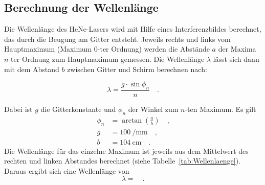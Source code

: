  \subsection{Berechnung der Wellenlänge}
 Die Wellenlänge des HeNe-Lasers wird mit Hilfe eines Interferenzbildes berechnet, das durch die Beugung am Gitter entsteht. Jeweils rechts und links vom Hauptmaximum (Maximum 0-ter Ordnung) werden die Abstände $a$ der Maxima $n$-ter Ordnung zum Hauptmaximum gemessen. Die Wellenlänge $\lambda$ lässt sich dann mit dem Abstand $b$ zwischen Gitter und Schirm berechnen nach:
 
 \begin{equation}
 \lambda = \frac{g \cdot \sin{\phi_n}}{n} \quad .
 \end{equation}
 
Dabei ist $g$ die Gitterkonstante und $\phi_n$ der Winkel zum $n$-ten Maximum.
Es gilt
\begin{align}
\phi_n &= \arctan{\left( \frac{a}{b} \right)} \quad \textrm{,}\\
g &= \SI{100}{\per\milli\meter} \quad \textrm{,}\\
b &= \SI{104}{\centi\meter} \quad .
\end{align}
Die Wellenlänge für das einzelne Maximum ist jeweils aus dem Mittelwert des rechten und linken Abstandes berechnet (siehe Tabelle~\ref{tab:Wellenlaenge}). Daraus ergibt sich eine Wellenlänge von
\begin{equation}
\lambda =  \quad .
\end{equation}
